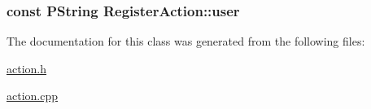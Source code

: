 \hypertarget{classRegisterAction_aa4a6618f15066d50aec6d2a4b07d20f}{
\subsubsection[{user}]{\setlength{\rightskip}{0pt plus 5cm}const PString {\bf RegisterAction::user}}}
\label{classRegisterAction_aa4a6618f15066d50aec6d2a4b07d20f}




The documentation for this class was generated from the following files:\begin{CompactItemize}
\item 
\hyperlink{action_8h}{action.h}\item 
\hyperlink{action_8cpp}{action.cpp}\end{CompactItemize}
